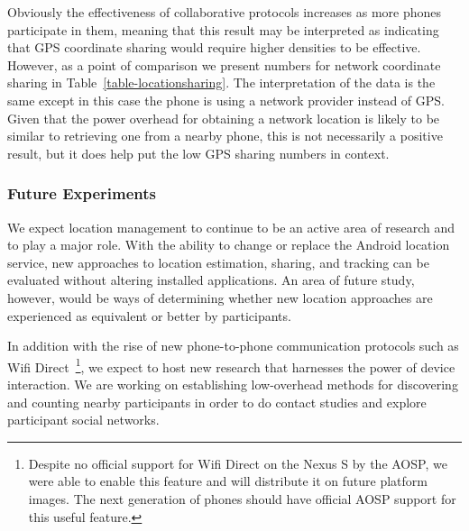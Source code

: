 Obviously the effectiveness of collaborative protocols increases as more
phones participate in them, meaning that this result may be interpreted as
indicating that GPS coordinate sharing would require higher densities to be
effective. However, as a point of comparison we present numbers for network
coordinate sharing in Table~\ref{table-locationsharing}. The interpretation
of the data is the same except in this case the phone is using a network
provider instead of GPS. Given that the power overhead for obtaining a
network location is likely to be similar to retrieving one from a nearby
phone, this is not necessarily a positive result, but it does help put the
low GPS sharing numbers in context.

\subsubsection{Future Experiments}

We expect location management to continue to be an active area of research
and \PhoneLab{} to play a major role. With the ability to change or replace
the Android location service, new approaches to location estimation, sharing,
and tracking can be evaluated without altering installed applications. An
area of future study, however, would be ways of determining whether new
location approaches are experienced as equivalent or better by \PhoneLab{}
participants.

In addition with the rise of new phone-to-phone communication protocols such
as Wifi Direct~\cite{wifi-direct}\footnote{Despite no official support for Wifi
Direct on the Nexus S by the AOSP, we were able to enable this feature and
will distribute it on future platform images. The next generation of
\PhoneLab{} phones should have official AOSP support for this useful
feature.}, we expect \PhoneLab{} to host new research that harnesses the
power of device interaction. We are working on establishing low-overhead
methods for discovering and counting nearby \PhoneLab{} participants in order
to do contact studies and explore participant social networks.
